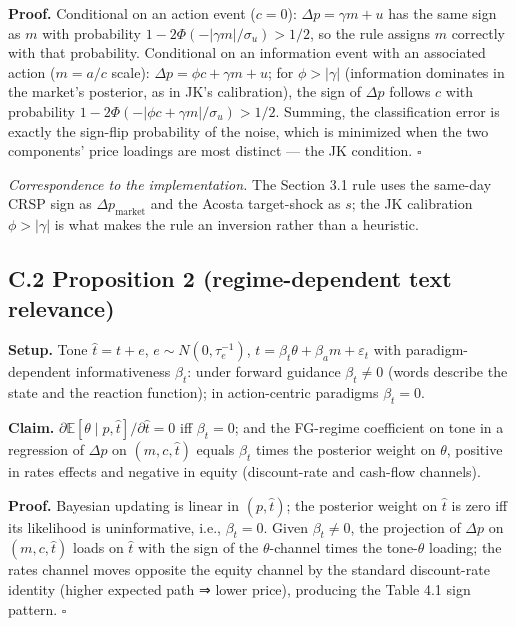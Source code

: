 \textbf{Proof.} Conditional on an action event (\(c = 0\)): \(\Delta p = \gamma m + u\) has the same sign as \(m\) with probability \(1 - 2\Phi(-|\gamma m|/\sigma_u) > 1/2\), so the rule assigns \(m\) correctly with that probability. Conditional on an information event with an associated action (\(m = a/c\) scale): \(\Delta p = \phi c + \gamma m + u\); for \(\phi > |\gamma|\) (information dominates in the market's posterior, as in JK's calibration), the sign of \(\Delta p\) follows \(c\) with probability \(1 - 2\Phi(-|\phi c + \gamma m|/\sigma_u) > 1/2\). Summing, the classification error is exactly the sign-flip probability of the noise, which is minimized when the two components' price loadings are most distinct --- the JK condition. \(\square\)

\emph{Correspondence to the implementation.} The Section 3.1 rule uses the same-day CRSP sign as \(\Delta p_{\text{market}}\) and the Acosta target-shock as \(s\); the JK calibration \(\phi > |\gamma|\) is what makes the rule an inversion rather than a heuristic.

\subsection{C.2 Proposition 2 (regime-dependent text relevance)}\label{c.2-proposition-2-regime-dependent-text-relevance}

\textbf{Setup.} Tone \(\hat t = t + e\), \(e \sim N(0, \tau_e^{-1})\), \(t = \beta_t \theta + \beta_a m + \varepsilon_t\) with paradigm-dependent informativeness \(\beta_t\): under forward guidance \(\beta_t \neq 0\) (words describe the state and the reaction function); in action-centric paradigms \(\beta_t = 0\).

\textbf{Claim.} \(\partial \mathbb{E}[\theta \mid p, \hat t] / \partial \hat t = 0\) iff \(\beta_t = 0\); and the FG-regime coefficient on tone in a regression of \(\Delta p\) on \((m, c, \hat t)\) equals \(\beta_t\) times the posterior weight on \(\theta\), positive in rates effects and negative in equity (discount-rate and cash-flow channels).

\textbf{Proof.} Bayesian updating is linear in \((p, \hat t)\); the posterior weight on \(\hat t\) is zero iff its likelihood is uninformative, i.e., \(\beta_t = 0\). Given \(\beta_t \neq 0\), the projection of \(\Delta p\) on \((m, c, \hat t)\) loads on \(\hat t\) with the sign of the \(\theta\)-channel times the tone-\(\theta\) loading; the rates channel moves opposite the equity channel by the standard discount-rate identity (higher expected path ⇒ lower price), producing the Table 4.1 sign pattern. \(\square\)

